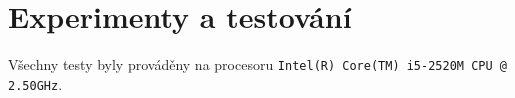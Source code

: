 \chapter{Experimenty a testování}

Všechny testy byly prováděny na procesoru \texttt{Intel(R) Core(TM) i5-2520M CPU @ 2.50GHz}.
